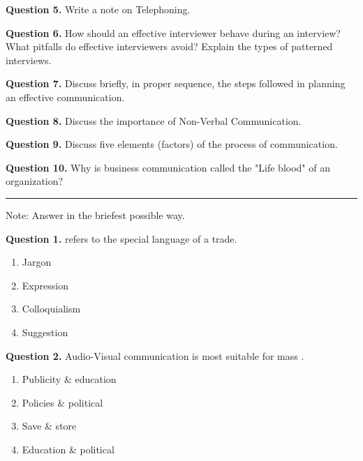 \documentclass[11pt,a4paper]{article}
\begin{document}
\medskip


\noindent   \textbf{Question 5.} Write a note on Telephoning.

\medskip


\noindent   \textbf{Question 6.} How should an effective interviewer behave during an interview? What pitfalls do effective interviewers avoid? Explain the types of patterned interviews.

\medskip


\noindent   \textbf{Question 7.} Discuss briefly, in proper sequence, the steps followed in planning an effective communication.

\medskip


\noindent   \textbf{Question 8.} Discuss the importance of Non-Verbal Communication.

\medskip


\noindent   \textbf{Question 9.} Discuss five elements (factors) of the process of communication.

\medskip


\noindent   \textbf{Question 10.} Why is business communication called the "Life blood" of an organization?

\bigskip


\rule{\linewidth}{0.4pt}\smallskip

Note: Answer in the briefest possible way.

\medskip


\noindent   \textbf{Question 1.} \underline{\hspace{2cm}} refers to the special language of a trade.

\begin{enumerate}[label=(\alph*),itemsep=2pt]
  \item Jargon
  \item Expression
  \item Colloquialism
  \item Suggestion
\end{enumerate}

\medskip


\noindent   \textbf{Question 2.} Audio-Visual communication is most suitable for mass \underline{\hspace{2cm}}.

\begin{enumerate}[label=(\alph*),itemsep=2pt]
  \item Publicity \& education
  \item Policies \& political
  \item Save \& store
  \item Education \& political
\end{enumerate}
\end{document}
